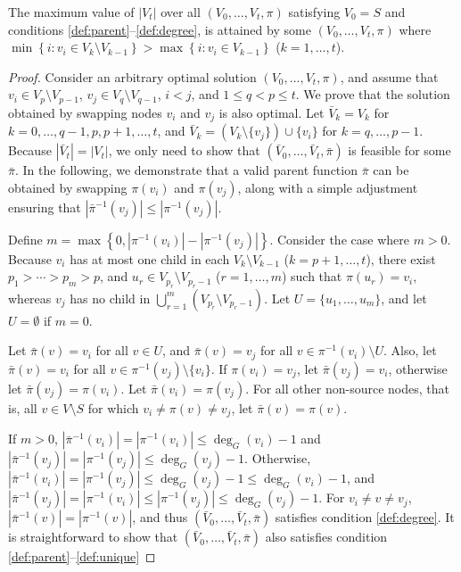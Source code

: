 \begin{lemma}
\label{lemma:degorder}
The maximum value of $\left|V_t\right|$ over all $\left(V_0,\ldots,V_t,\pi\right)$ satisfying $V_0=S$ and
conditions \ref{def:parent}--\ref{def:degree}, is attained by some
$\left(V_0,\ldots,V_t,\pi\right)$ where \\
$\min\left\{i: v_i\in V_{k}\setminus V_{k-1}\right\}>\max\left\{i: v_i\in V_{k-1}\right\}$ ($k=1,\ldots,t$).
\end{lemma}
\begin{proof}

Consider an arbitrary optimal solution $\left(V_0,\ldots,V_t,\pi\right)$,
and assume that $v_i\in V_p\setminus V_{p-1}$, $v_j\in V_{q}\setminus V_{q-1}$, $i<j$, and $1\leq q<p\leq t$.
We prove that the solution 
obtained by swapping nodes $v_i$ and $v_j$ is also optimal.
Let $\bar{V}_k=V_k$ for $k=0,\ldots,q-1, p, p+1,\ldots,t$, and $\bar{V}_k=\left(V_k\setminus\{v_j\}\right)\cup\{v_i\}$ for $k=q,\ldots,p-1$.
Because $\left|\bar{V}_t\right|=\left|V_t\right|$, we only need to show that $\left(\bar{V}_0,\ldots,\bar{V}_t,\bar{\pi}\right)$ is feasible for some $\bar{\pi}$.
In the following, we demonstrate that a valid parent function $\bar{\pi}$ can be obtained by swapping $\pi(v_i)$ and $\pi(v_j)$,
along with a simple adjustment ensuring that $\left|\bar{\pi}^{-1}(v_j)\right|\leq\left|\pi^{-1}(v_j)\right|$.

Define $m=\max\left\{0,\left|\pi^{-1}(v_i)\right|-\left|\pi^{-1}(v_j)\right|\right\}$.
Consider the case where $m>0$.
Because $v_i$ has at most one child in each $V_k\setminus V_{k-1}$ ($k=p+1,\ldots,t$),
there exist $p_1>\cdots>p_m>p$, and $u_r\in V_{p_r}\setminus V_{p_r-1}$ ($r=1,\ldots,m$) such that $\pi(u_r)=v_i$, whereas $v_j$ has no child in
$\bigcup_{r=1}^m\left(V_{p_r}\setminus V_{p_r-1}\right)$.
Let $U=\{u_1,\ldots,u_m\}$, and let $U=\emptyset$ if $m=0$.

Let $\bar{\pi}(v)=v_i$ for all $v\in U$, and $\bar{\pi}(v)=v_j$ for all $v\in \pi^{-1}(v_i)\setminus U$.
Also, let $\bar{\pi}(v)=v_i$ for all $v\in \pi^{-1}(v_j)\setminus\{v_i\}$.
If $\pi(v_i)=v_j$, let $\bar{\pi}(v_j)=v_i$, otherwise let $\bar{\pi}(v_j)=\pi(v_i)$.
Let $\bar{\pi}(v_i)=\pi(v_j)$.
For all other non-source nodes, that is, all $v\in V\setminus S$ for which $v_i\neq\pi(v)\neq v_j$, let $\bar{\pi}(v)=\pi(v)$.

If $m>0$, $\left|\bar{\pi}^{-1}(v_i)\right|=\left|\pi^{-1}(v_i)\right|\leq\deg_G(v_i)-1$
and $\left|\bar{\pi}^{-1}(v_j)\right|=\left|\pi^{-1}(v_j)\right|\leq\deg_G(v_j)-1$.
Otherwise, $\left|\bar{\pi}^{-1}(v_i)\right|=\left|\pi^{-1}(v_j)\right|\leq\deg_G(v_j)-1\leq\deg_G(v_i)-1$,
and $\left|\bar{\pi}^{-1}(v_j)\right|=\left|\pi^{-1}(v_i)\right|\leq\left|\pi^{-1}(v_j)\right|\leq\deg_G(v_j)-1$.
For $v_i\neq v\neq v_j$, $\left|\bar{\pi}^{-1}(v)\right|=\left|\pi^{-1}(v)\right|$,
and thus $\left(\bar{V}_0,\ldots,\bar{V}_t,\bar{\pi}\right)$ satisfies condition \ref{def:degree}.
It is straightforward to show that $\left(\bar{V}_0,\ldots,\bar{V}_t,\bar{\pi}\right)$ also satisfies condition \ref{def:parent}--\ref{def:unique}
\end{proof}

